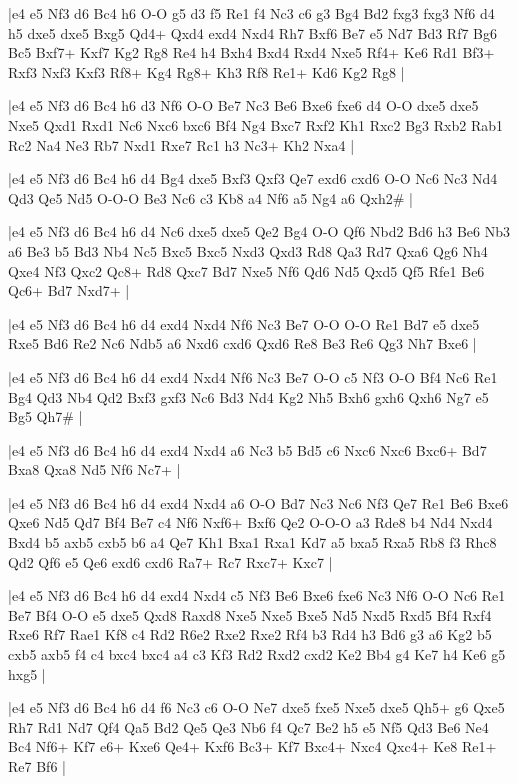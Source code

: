 \whitename{}
\blackname{}
\makegametitle
|e4 e5 Nf3 d6 Bc4 h6 O-O g5 d3 f5 Re1 f4 Nc3 c6 g3 Bg4 Bd2 fxg3 fxg3 Nf6 d4 h5 dxe5 dxe5 Bxg5 Qd4+ Qxd4 exd4 Nxd4 Rh7 Bxf6 Be7 e5 Nd7 Bd3 Rf7 Bg6 Bc5 Bxf7+ Kxf7 Kg2 Rg8 Re4 h4 Bxh4 Bxd4 Rxd4 Nxe5 Rf4+ Ke6 Rd1 Bf3+ Rxf3 Nxf3 Kxf3 Rf8+ Kg4 Rg8+ Kh3 Rf8 Re1+ Kd6 Kg2 Rg8  |

\whitename{}
\blackname{}
\makegametitle
|e4 e5 Nf3 d6 Bc4 h6 d3 Nf6 O-O Be7 Nc3 Be6 Bxe6 fxe6 d4 O-O dxe5 dxe5 Nxe5 Qxd1 Rxd1 Nc6 Nxc6 bxc6 Bf4 Ng4 Bxc7 Rxf2 Kh1 Rxc2 Bg3 Rxb2 Rab1 Rc2 Na4 Ne3 Rb7 Nxd1 Rxe7 Rc1 h3 Nc3+ Kh2 Nxa4  |

\whitename{}
\blackname{}
\makegametitle
|e4 e5 Nf3 d6 Bc4 h6 d4 Bg4 dxe5 Bxf3 Qxf3 Qe7 exd6 cxd6 O-O Nc6 Nc3 Nd4 Qd3 Qe5 Nd5 O-O-O Be3 Nc6 c3 Kb8 a4 Nf6 a5 Ng4 a6 Qxh2\#  |

\whitename{}
\blackname{}
\makegametitle
|e4 e5 Nf3 d6 Bc4 h6 d4 Nc6 dxe5 dxe5 Qe2 Bg4 O-O Qf6 Nbd2 Bd6 h3 Be6 Nb3 a6 Be3 b5 Bd3 Nb4 Nc5 Bxc5 Bxc5 Nxd3 Qxd3 Rd8 Qa3 Rd7 Qxa6 Qg6 Nh4 Qxe4 Nf3 Qxc2 Qc8+ Rd8 Qxc7 Bd7 Nxe5 Nf6 Qd6 Nd5 Qxd5 Qf5 Rfe1 Be6 Qc6+ Bd7 Nxd7+  |

\whitename{}
\blackname{}
\makegametitle
|e4 e5 Nf3 d6 Bc4 h6 d4 exd4 Nxd4 Nf6 Nc3 Be7 O-O O-O Re1 Bd7 e5 dxe5 Rxe5 Bd6 Re2 Nc6 Ndb5 a6 Nxd6 cxd6 Qxd6 Re8 Be3 Re6 Qg3 Nh7 Bxe6  |

\whitename{}
\blackname{}
\makegametitle
|e4 e5 Nf3 d6 Bc4 h6 d4 exd4 Nxd4 Nf6 Nc3 Be7 O-O c5 Nf3 O-O Bf4 Nc6 Re1 Bg4 Qd3 Nb4 Qd2 Bxf3 gxf3 Nc6 Bd3 Nd4 Kg2 Nh5 Bxh6 gxh6 Qxh6 Ng7 e5 Bg5 Qh7\#  |

\whitename{}
\blackname{}
\makegametitle
|e4 e5 Nf3 d6 Bc4 h6 d4 exd4 Nxd4 a6 Nc3 b5 Bd5 c6 Nxc6 Nxc6 Bxc6+ Bd7 Bxa8 Qxa8 Nd5 Nf6 Nc7+  |

\whitename{}
\blackname{}
\makegametitle
|e4 e5 Nf3 d6 Bc4 h6 d4 exd4 Nxd4 a6 O-O Bd7 Nc3 Nc6 Nf3 Qe7 Re1 Be6 Bxe6 Qxe6 Nd5 Qd7 Bf4 Be7 c4 Nf6 Nxf6+ Bxf6 Qe2 O-O-O a3 Rde8 b4 Nd4 Nxd4 Bxd4 b5 axb5 cxb5 b6 a4 Qe7 Kh1 Bxa1 Rxa1 Kd7 a5 bxa5 Rxa5 Rb8 f3 Rhc8 Qd2 Qf6 e5 Qe6 exd6 cxd6 Ra7+ Rc7 Rxc7+ Kxc7  |

\whitename{}
\blackname{}
\makegametitle
|e4 e5 Nf3 d6 Bc4 h6 d4 exd4 Nxd4 c5 Nf3 Be6 Bxe6 fxe6 Nc3 Nf6 O-O Nc6 Re1 Be7 Bf4 O-O e5 dxe5 Qxd8 Raxd8 Nxe5 Nxe5 Bxe5 Nd5 Nxd5 Rxd5 Bf4 Rxf4 Rxe6 Rf7 Rae1 Kf8 c4 Rd2 R6e2 Rxe2 Rxe2 Rf4 b3 Rd4 h3 Bd6 g3 a6 Kg2 b5 cxb5 axb5 f4 c4 bxc4 bxc4 a4 c3 Kf3 Rd2 Rxd2 cxd2 Ke2 Bb4 g4 Ke7 h4 Ke6 g5 hxg5  |

\whitename{}
\blackname{}
\makegametitle
|e4 e5 Nf3 d6 Bc4 h6 d4 f6 Nc3 c6 O-O Ne7 dxe5 fxe5 Nxe5 dxe5 Qh5+ g6 Qxe5 Rh7 Rd1 Nd7 Qf4 Qa5 Bd2 Qe5 Qe3 Nb6 f4 Qc7 Be2 h5 e5 Nf5 Qd3 Be6 Ne4 Bc4 Nf6+ Kf7 e6+ Kxe6 Qe4+ Kxf6 Bc3+ Kf7 Bxc4+ Nxc4 Qxc4+ Ke8 Re1+ Re7 Bf6  |

